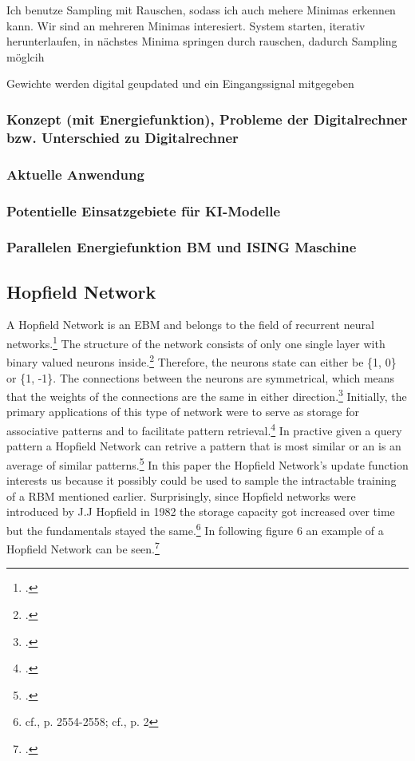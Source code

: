 Ich benutze Sampling mit Rauschen, sodass ich auch mehere Minimas erkennen kann. Wir sind an mehreren Minimas interesiert. 
System starten, iterativ herunterlaufen, in nächstes Minima springen durch rauschen, dadurch Sampling möglcih 

Gewichte werden digital geupdated und ein Eingangssignal mitgegeben 

\subsubsection{Konzept (mit Energiefunktion), Probleme der Digitalrechner bzw. Unterschied zu Digitalrechner}
\subsubsection{Aktuelle Anwendung}




\subsubsection{Potentielle Einsatzgebiete für KI-Modelle}
\subsubsection{Parallelen Energiefunktion BM und ISING Maschine}

\subsection{Hopfield Network}

A Hopfield Network is an \ac{EBM} and belongs to the field of recurrent neural networks.\footcite[cf.][35]{dramschChapterOne702020}
The structure of the network consists of only one single layer with binary valued neurons inside.\footcite[cf.][7]{ahadNeuralNetworksWireless2016}
Therefore, the neurons state can either be \{1, 0\} or \{1, -1\}.
The connections between the neurons are symmetrical, which means that the weights of the connections are the same in either direction.\footcite[cf.][7]{ahadNeuralNetworksWireless2016}
Initially, the primary applications of this type of network were to serve as storage for associative patterns and to facilitate pattern retrieval.\footcite[cf.][2]{ramsauerHopfieldNetworksAll2021}
In practive given a query pattern a Hopfield Network can retrive a pattern that is most similar or an is an average of similar patterns.\footcite[cf.][2]{ramsauerHopfieldNetworksAll2021}
In this paper the Hopfield Network's update function interests us because it possibly could be used to sample the intractable training of a \ac{RBM} mentioned earlier.
Surprisingly, since Hopfield networks were introduced by J.J Hopfield in 1982 the storage capacity got increased over time but the fundamentals stayed the same.\footnote{cf.\cite{hopfieldNeuralNetworksPhysical1982}, p. 2554-2558; cf.\cite{ramsauerHopfieldNetworksAll2021}, p. 2}
In following figure 6 an example of a Hopfield Network can be seen.\footcite[cf.][1-2]{yaoMassivelyParallelAssociative2013}

